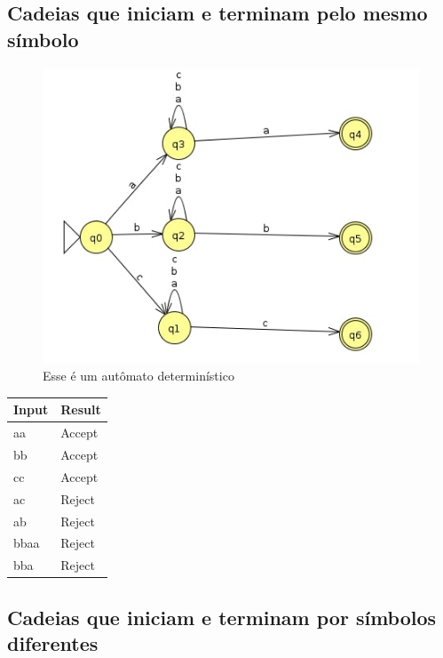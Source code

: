 \documentclass[11pt]{article}
\begin{document}
\subsection{Cadeias que iniciam e terminam pelo mesmo símbolo}
\label{sec:orga00cbe9}
\begin{figure}[htbp]
\centering
\includegraphics[width=.9\linewidth]{./q1/e/q1e.jpg}
\caption{\label{fig:orgea5a801}
Esse é um autômato determinístico}
\end{figure}

\begin{center}
\begin{tabular}{ll}
Input & Result\\
\hline
aa & Accept\\
bb & Accept\\
cc & Accept\\
ac & Reject\\
ab & Reject\\
bbaa & Reject\\
bba & Reject\\
\end{tabular}
\end{center}
\subsection{Cadeias que iniciam e terminam por símbolos diferentes}
\label{sec:org91a1e48}
\end{document}
